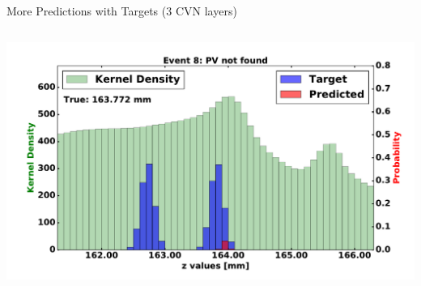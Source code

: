 \begin{frame}{More Predictions with Targets (3 CVN layers)}
\begin{columns}[c]
\begin{center}
           \includegraphics[width=1\textwidth, height=0.45\textwidth, trim=18 0 18 0]{images/120000_3layer_52.pdf}
       \end{center}
  \end{columns}
\end{frame}

